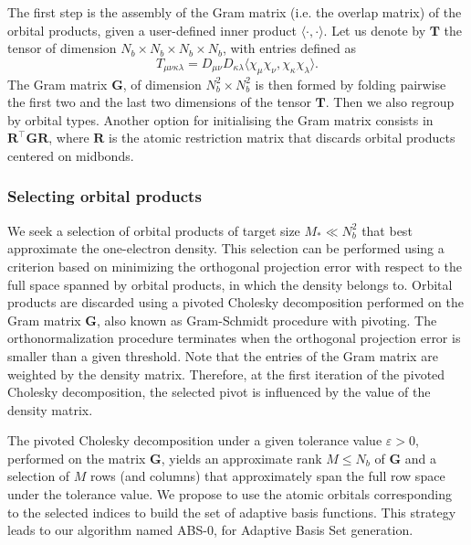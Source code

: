 \documentclass[a4paper,11pt]{article}
\begin{document}
The first step is the assembly of the Gram matrix (i.e. the overlap matrix) of
the orbital products, given a user-defined inner product
$\langle\cdot,\cdot\rangle$. Let us denote by $\bm T$ the tensor of dimension
$N_b\times N_b\times N_b\times N_b$, with entries 
defined as
\[
    T_{\mu\nu\kappa\lambda} = D_{\mu\nu}D_{\kappa\lambda} 
    \langle \chi_{\mu}\chi_{\nu},\chi_{\kappa}\chi_{\lambda}\rangle.
\]
The Gram matrix $\bm G$, of dimension $N_b^2\times N_b^2$ is then formed by
folding pairwise the first two and the last two dimensions of the tensor 
$\bm T$. Then we also regroup by orbital types.
Another option for initialising the Gram matrix consists in $\bm
R^\top \bm G\bm R$, where $\bm R$ is the atomic restriction matrix that discards
orbital products centered on midbonds.

\subsubsection{Selecting orbital products}

We seek a selection of orbital products of target size $M_*\ll N_b^2$ 
that best approximate the one-electron density. This selection can be performed
using a criterion based on minimizing the orthogonal projection error with
respect to the full space spanned by orbital products, in which the density 
belongs to. Orbital products are discarded using a pivoted Cholesky 
decomposition performed on the Gram matrix $\bm G$, 
also known as Gram-Schmidt procedure with pivoting. The orthonormalization
procedure terminates when the orthogonal projection error is smaller than a
given threshold. Note that the entries of the Gram matrix are weighted by the
density matrix. Therefore, at the first iteration of the pivoted Cholesky 
decomposition, the selected pivot is influenced by the value of the density
matrix. 


The pivoted Cholesky decomposition under a given tolerance value
$\varepsilon>0$, performed on the matrix $\bm G$, yields an approximate rank
$M\leq N_b$ of $\bm G$ and a selection of $M$ rows (and columns) that 
approximately span the full row space under the tolerance value. We propose to
use the atomic orbitals corresponding to the selected indices to build the set
of adaptive basis functions. This strategy leads to our algorithm named ABS-0,
for Adaptive Basis Set generation.
\end{document}
